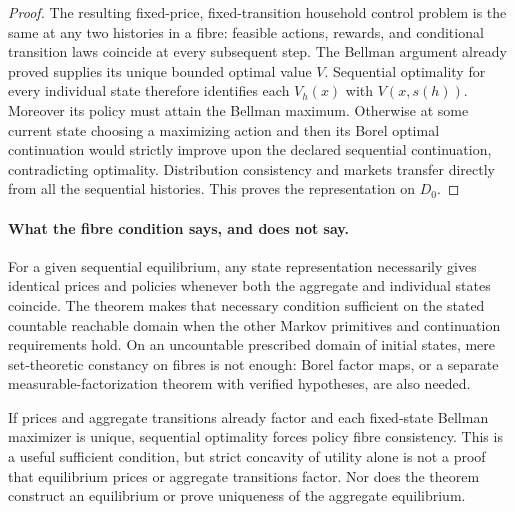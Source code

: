\documentclass[11pt,a4paper]{article}
\theoremstyle{definition}
\begin{document}
\begin{proof}
The resulting fixed-price, fixed-transition household control problem is the same at any two histories in a fibre: feasible actions, rewards, and conditional transition laws coincide at every subsequent step. The Bellman argument already proved supplies its unique bounded optimal value $V$. Sequential optimality for every individual state therefore identifies each $V_h(x)$ with $V(x,s(h))$. Moreover its policy must attain the Bellman maximum. Otherwise at some current state choosing a maximizing action and then its Borel optimal continuation would strictly improve upon the declared sequential continuation, contradicting optimality. Distribution consistency and markets transfer directly from all the sequential histories. This proves the representation on $D_0$.
\end{proof}

\paragraph{What the fibre condition says, and does not say.}
For a given sequential equilibrium, any state representation necessarily gives identical prices and policies whenever both the aggregate and individual states coincide. The theorem makes that necessary condition sufficient on the stated countable reachable domain when the other Markov primitives and continuation requirements hold. On an uncountable prescribed domain of initial states, mere set-theoretic constancy on fibres is not enough: Borel factor maps, or a separate measurable-factorization theorem with verified hypotheses, are also needed.

If prices and aggregate transitions already factor and each fixed-state Bellman maximizer is unique, sequential optimality forces policy fibre consistency. This is a useful sufficient condition, but strict concavity of utility alone is not a proof that equilibrium prices or aggregate transitions factor. Nor does the theorem construct an equilibrium or prove uniqueness of the aggregate equilibrium.
\end{document}
